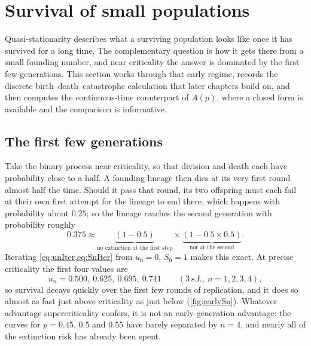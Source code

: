 \section{Survival of small populations}
\label{sec:small}

Quasi-stationarity describes what a surviving population looks like once it has survived
for a long time. The complementary question is how it gets there from a small founding
number, and near criticality the answer is dominated by the first few generations. This
section works through that early regime, records the discrete birth--death--catastrophe
calculation that later chapters build on, and then computes the continuous-time
counterpart of $A(p)$, where a closed form is available and the comparison is
informative.

\subsection{The first few generations}
\label{sec:firstgens}

Take the binary process near criticality, so that division and death each have
probability close to a half. A founding lineage then dies at its very first round almost
half the time. Should it pass that round, its two offspring must each fail at their own
first attempt for the lineage to end there, which happens with probability about
$0.25$; so the lineage reaches the second generation with probability roughly
\begin{equation*}
0.375 \approx
\underbrace{(1-0.5)}_{\text{no extinction at the first step}}
\times
\underbrace{(1-0.5\times0.5)}_{\text{nor at the second}} .
\end{equation*}
Iterating \cref{eq:unIter,eq:SnIter} from $u_0=0$, $S_0=1$ makes this exact. At precise
criticality the first four values are
\begin{equation*}
u_n = 0.500,\ 0.625,\ 0.695,\ 0.741 \qquad(3\ \text{s.f.},\ n=1,2,3,4),
\end{equation*}
so survival decays quickly over the first few rounds of replication, and it does so
almost as fast just above criticality as just below (\cref{fig:earlySn}). Whatever
advantage supercriticality confers, it is not an early-generation advantage: the curves
for $p=0.45$, $0.5$ and $0.55$ have barely separated by $n=4$, and nearly all of the
extinction risk has already been spent.


